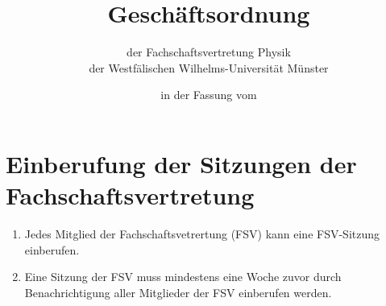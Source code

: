 


\pagestyle{scrheadings}

\title{Geschäftsordnung}
\subtitle{der Fachschaftsvertretung Physik\\
der Westfälischen Wilhelms-Universität Münster}
\date{in der Fassung vom }
\author{}



\maketitle

\section{Einberufung der Sitzungen der Fachschaftsvertretung}
\begin{enumerate}
	\item Jedes Mitglied der Fachschaftsvetrertung (FSV) kann eine FSV-Sitzung einberufen.
	\item Eine Sitzung der FSV muss mindestens eine Woche zuvor durch Benachrichtigung aller Mitglieder der FSV einberufen werden.
\end{enumerate}

